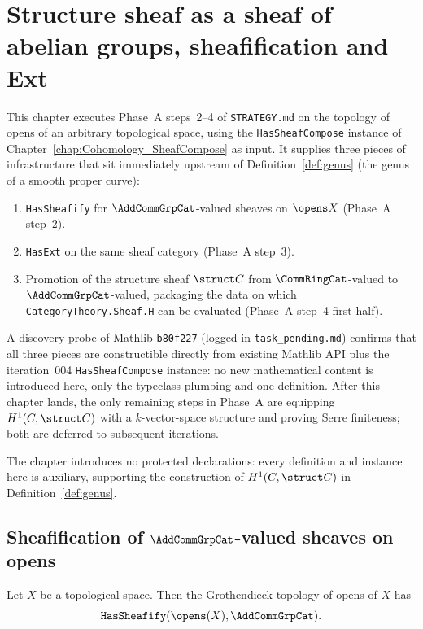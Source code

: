 \chapter{Structure sheaf as a sheaf of abelian groups, sheafification and Ext}
\label{chap:Cohomology_StructureSheafAb}

This chapter executes Phase~A steps~2--4 of \texttt{STRATEGY.md} on the topology of opens of an arbitrary topological space, using the \lstinline{HasSheafCompose} instance of Chapter~\ref{chap:Cohomology_SheafCompose} as input. It supplies three pieces of infrastructure that sit immediately upstream of Definition~\ref{def:genus} (the genus of a smooth proper curve):

\begin{enumerate}
  \item \texttt{HasSheafify} for $\AddCommGrpCat$-valued sheaves on $\opens X$ (Phase~A step~2).
  \item \texttt{HasExt} on the same sheaf category (Phase~A step~3).
  \item Promotion of the structure sheaf $\struct C$ from $\CommRingCat$-valued to $\AddCommGrpCat$-valued, packaging the data on which \lstinline{CategoryTheory.Sheaf.H} can be evaluated (Phase~A step~4 first half).
\end{enumerate}

A discovery probe of Mathlib \texttt{b80f227} (logged in \texttt{task\_pending.md}) confirms that all three pieces are constructible directly from existing Mathlib API plus the iteration~004 \lstinline{HasSheafCompose} instance: no new mathematical content is introduced here, only the typeclass plumbing and one definition. After this chapter lands, the only remaining steps in Phase~A are equipping $H^1(C, \struct C)$ with a $k$-vector-space structure and proving Serre finiteness; both are deferred to subsequent iterations.

The chapter introduces no protected declarations: every definition and instance here is auxiliary, supporting the construction of $H^1(C, \struct C)$ in Definition~\ref{def:genus}.

\section{Sheafification of $\AddCommGrpCat$-valued sheaves on opens}

\begin{theorem}
  \label{thm:HasSheafify_Opens_AddCommGrp}
  Let $X$ be a topological space. Then the Grothendieck topology of opens of $X$ has
  \[
    \mathtt{HasSheafify}(\opens(X), \AddCommGrpCat).
  \]
\end{theorem}

